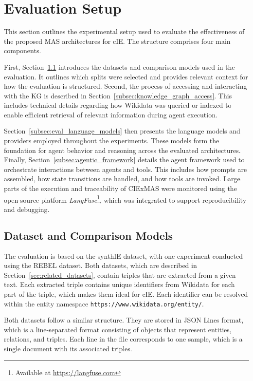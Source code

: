 \documentclass[a4paper,oneside,bibliography=totoc]{scrbook}
\begin{document}
\section{Evaluation Setup}
\label{sec:evaluation_setup}

This section outlines the experimental setup used to evaluate the effectiveness of the proposed \ac{MAS} architectures for \ac{cIE}. The structure comprises four main components.

First, Section~\ref{subsec:dataset} introduces the datasets and comparison models used in the evaluation. It outlines which splits were selected and provides relevant context for how the evaluation is structured. Second, the process of accessing and interacting with the \ac{KG} is described in Section~\ref{subsec:knowledge_graph_access}. This includes technical details regarding how Wikidata was queried or indexed to enable efficient retrieval of relevant information during agent execution.

Section~\ref{subsec:eval_language_models} then presents the language models and providers employed throughout the experiments. These models form the foundation for agent behavior and reasoning across the evaluated architectures. Finally, Section~\ref{subsec:agentic_framework} details the agent framework used to orchestrate interactions between agents and tools. This includes how prompts are assembled, how state transitions are handled, and how tools are invoked. Large parts of the execution and traceability of CIExMAS were monitored using the open-source platform \textit{LangFuse}\footnote{Available at \url{https://langfuse.com}}, which was integrated to support reproducibility and debugging.

\subsection{Dataset and Comparison Models}
\label{subsec:dataset}

The evaluation is based on the synthIE dataset, with one experiment conducted using the REBEL dataset. Both datasets, which are described in Section~\ref{sec:related_datasets}, contain triples that are extracted from a given text. Each extracted triple contains unique identifiers from Wikidata for each part of the triple, which makes them ideal for \ac{cIE}. Each identifier can be resolved within the entity namespace \texttt{https://www.wikidata.org/entity/}.

Both datasets follow a similar structure. They are stored in JSON Lines format, which is a line-separated format consisting of objects that represent entities, relations, and triples. Each line in the file corresponds to one sample, which is a single document with its associated triples.
\end{document}
